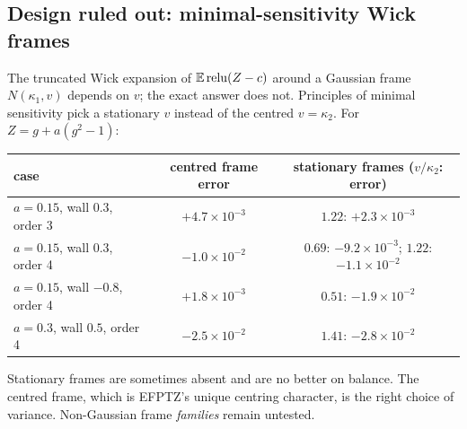 \subsection{Design ruled out: minimal-sensitivity Wick frames}
The truncated Wick expansion of $\mathbb E\operatorname{relu}(Z-c)$ around a Gaussian frame $N(\kappa_1,v)$ depends on $v$; the exact answer does not. Principles of
minimal sensitivity pick a stationary $v$ instead of the centred $v=\kappa_2$. For $Z=g+a(g^2-1)$:
\begin{center}\small
\begin{tabular}{lcc}\toprule
case & centred frame error & stationary frames ($v/\kappa_2$: error)\\\midrule
$a=0.15$, wall $0.3$, order 3 & $+4.7\times10^{-3}$ & $1.22$: $+2.3\times10^{-3}$\\
$a=0.15$, wall $0.3$, order 4 & $-1.0\times10^{-2}$ & $0.69$: $-9.2\times10^{-3}$; $1.22$: $-1.1\times10^{-2}$\\
$a=0.15$, wall $-0.8$, order 4 & $+1.8\times10^{-3}$ & $0.51$: $-1.9\times10^{-2}$\\
$a=0.3$, wall $0.5$, order 4 & $-2.5\times10^{-2}$ & $1.41$: $-2.8\times10^{-2}$\\\bottomrule
\end{tabular}
\end{center}
Stationary frames are sometimes absent and are no better on balance. The centred frame, which is EFPTZ's unique centring character, is the
right choice of variance. Non-Gaussian frame \emph{families} remain untested.
